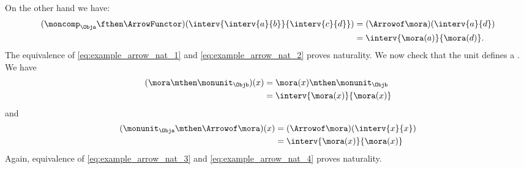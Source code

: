 %
On the other hand we have:
%
\begin{equation}
    \label{eq:example_arrow_nat_2}
    \begin{aligned}
        (\moncomp_\Obja \fthen \ArrowFunctor)(\interv{\interv{a}{b}}{\interv{c}{d}})
         & =(\Arrowof\mora)(\interv{a}{d}) \\
         & =\interv{\mora(a)}{\mora(d)}.
    \end{aligned}
\end{equation}
%
The equivalence of \cref{eq:example_arrow_nat_1} and \cref{eq:example_arrow_nat_2} proves naturality.
We now check that the unit defines a .
We have
%
\begin{equation}
    \label{eq:example_arrow_nat_3}
    \begin{aligned}
        (\mora \mthen \monunit_\Objb)(x)
         & =\mora(x)\mthen \monunit_\Objb \\
         & =\interv{\mora(x)}{\mora(x)}
    \end{aligned}
\end{equation}
%
and
%
\begin{equation}
    \label{eq:example_arrow_nat_4}
    \begin{aligned}
        (\monunit_\Obja \mthen \Arrowof\mora)(x)
         & =(\Arrowof\mora)(\interv{x}{x}) \\
         & =\interv{\mora(x)}{\mora(x)}
    \end{aligned}
\end{equation}
%
Again, equivalence of \cref{eq:example_arrow_nat_3} and \cref{eq:example_arrow_nat_4} proves naturality.

